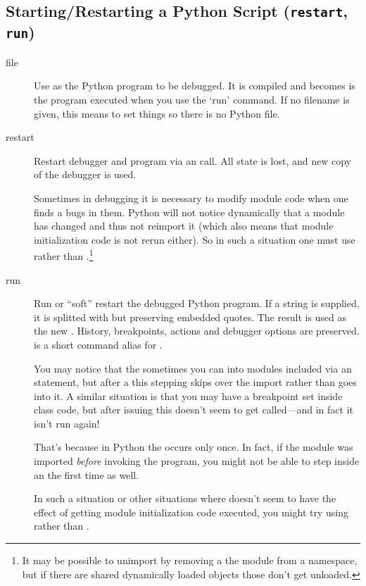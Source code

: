 \subsection{Starting/Restarting a Python Script ({\tt restart}, {\tt run})\label{subsection-restart}}

\begin{description}

\item[file \label{command:file}]

Use  as the Python program to be debugged.
It is compiled and becomes is the program executed when you use the `run'
command.  If no filename is given, this means to set things so there
is no Python file.

\item[restart ]\label{command:restart}

Restart debugger and program via an  call. All state
is lost, and new copy of the debugger is used.

Sometimes in debugging it is necessary to modify module code when one
finds a bugs in them. Python will not notice dynamically that a module
has changed and thus not reimport it (which also means that module
initialization code is not rerun either). So in such a situation one
must use  rather than .\footnote{It may be
possible to unimport by removing a the module from a namespace, but if
there are shared dynamically loaded objects those don't get unloaded.}

\item[run ]\label{command:run}

Run or ``soft'' restart the debugged Python program. If a string is
supplied, it is splitted with  but preserving embedded
quotes. The result is used as the new .  History,
breakpoints, actions and debugger options are preserved.   is
a short command alias for .

You may notice that the sometimes you can  into modules
included via an  statement, but after a  this
stepping skips over the import rather than goes into it. A similar
situation is that you may have a breakpoint set inside class
 code, but after issuing  this doesn't seem
to get called---and in fact it isn't run again!

That's because in Python the  occurs only once. In fact,
if the module was imported \emph{before\/} invoking the program, you
might not be able to step inside an  the first time as
well.

In such a situation or other situations where  doesn't seem
to have the effect of getting module initialization code executed,
you might try using  rather than .

\end{description}

